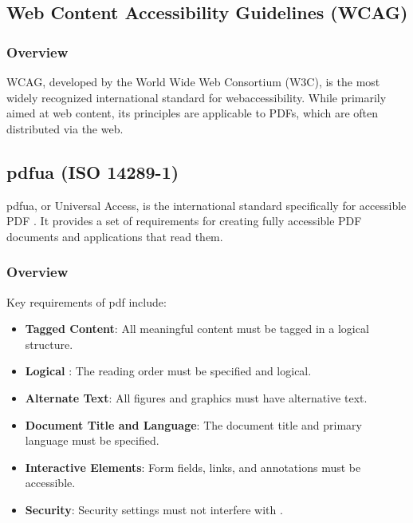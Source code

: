 \subsection{Web Content Accessibility Guidelines (WCAG)}
\label{subsec:wcag-pdf}

\subsubsection{Overview}
\label{ssubsec:wcag-pdf-overview}
\gls{WCAG}, developed by the World Wide Web Consortium (W3C), is the most widely recognized international standard for \gls{webaccessibility}. While primarily aimed at web content, its principles are applicable to PDFs, which are often distributed via the web.

\subsection{\gls{pdfua} (ISO 14289-1)}
\label{subsec:pdf-ua}
\gls{pdfua}, or Universal Access, is the international standard specifically for accessible PDF . It provides a set of requirements for creating fully accessible PDF documents and applications that read them.

\subsubsection{Overview}
\label{ssubsec:pdf-ua-overview}
Key requirements of \gls{pdf} include:
\begin{itemize}
	\item \textbf{Tagged Content}: All meaningful content must be tagged in a logical structure.
	\item \textbf{Logical }: The reading order must be specified and logical.
	\item \textbf{Alternate Text}: All figures and graphics must have alternative text.
	\item \textbf{Document Title and Language}: The document title and primary language must be specified.
	\item \textbf{Interactive Elements}: Form fields, links, and annotations must be accessible.
	\item \textbf{Security}: Security settings must not interfere with .
\end{itemize}

